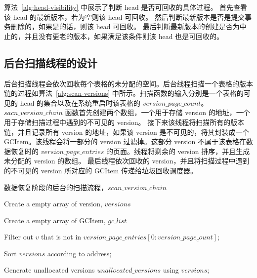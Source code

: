 算法~\ref{alg:head-visibility} 中展示了判断 head 是否可回收的具体过程。
首先查看该 head 的最新版本，若为空则该 head 可回收。
然后判断最新版本是否是提交事务删除的，如果是的话，则该 head 可回收。
最后判断最新版本的创建是否为中止的，并且没有更老的版本，如果满足该条件则该 head 也是可回收的。

\subsection{后台扫描线程的设计}
\label{ssec:background-scan}

后台扫描线程会依次回收每个表格的未分配的空间。后台线程扫描一个表格的版本链的过程如算法~\ref{alg:scan-versions} 中所示。扫描函数的输入分别是一个表格的可见的 head 的集合以及在系统重启时该表格的 $version\_page\_count$。$sacn\_version\_chain$ 函数首先创建两个数组，一个用于存储 version 的地址，一个用于存储扫描过程中遇到的不可见的 version。
接下来该线程将扫描所有的版本链，并且记录所有 version 的地址，如果该 version 是不可见的，将其封装成一个 GCItem。该线程会将一部分的 version 过滤掉。这部分 version 不属于该表格在数据恢复时的 $version\_page\_entries$ 的页面。线程将剩余的 version 排序，并且生成未分配的 version 的数组。
最后线程依次回收的 version，并且将扫描过程中遇到的不可见的 version 所对应的 GCItem 传递给垃圾回收调度器。


\begin{algorithm}[ht]
    \caption{数据恢复阶段的后台的扫描流程，$scan\_version\_chain$}
    \label{alg:scan-versions}
    \BlankLine

    Create a empty array of version, $versions$

    Create a empty array of GCItem, $gc\_list$


    Filter out $v$ that is not in $version\_page\_entries[0:version\_page_count]$;

    Sort $versions$ according to address;


    Generate unallocated versions $unallocated\_versions$ using $versions$;



\end{algorithm}

